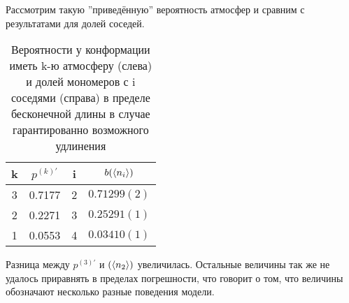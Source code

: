 Рассмотрим такую ''приведённую'' вероятность атмосфер и сравним с результатами для долей соседей.

\begin{table}[h]
    \centering
    \begin{tabular}{|c|c|c|c|}
    \hline
    k & $p^{(k)'}$ & i & $b(\langle n_{i} \rangle)$ \\ \hline
    3 & 0.7177 & 2 & $0.71299(2)$ \\ \hline
    2 & 0.2271 & 3 & $0.25291(1)$ \\ \hline
    1 & 0.0553 & 4 & $0.03410(1)$\\ \hline
    \end{tabular}
    \caption{Вероятности у конформации иметь k-ю атмосферу (слева) и долей мономеров с i соседями (справа) в пределе бесконечной длины в случае гарантированно возможного удлинения}
    \label{tab:Prellb_Compare2}
\end{table}

Разница между $p^{(3)'}$ и $(\langle n_{2} \rangle)$ увеличилась. Остальные величины так же не удалось приравнять в пределах погрешности, что говорит о том, что величины обозначают несколько разные поведения модели.



